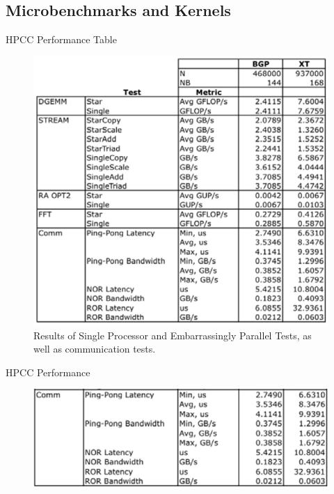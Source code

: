 \documentclass{beamer}
\begin{document}
\subsection{Microbenchmarks and Kernels}
\begin{frame}{HPCC Performance Table}
\begin{figure}
\begin{center}
\includegraphics[scale=0.33]{figs/single.png}
\caption{Results of Single Processor and Embarrassingly Parallel Tests, as well as
communication tests.}
\end{center}
\end{figure}
\end{frame}

\begin{frame}{HPCC Performance}
\begin{figure}
\begin{center}
\includegraphics[scale=0.7]{figs/hpcc1.png}
\end{center}
\end{figure}
\end{frame}
\end{document}
